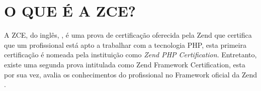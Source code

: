 \chapter{O QUE É A ZCE?}
\label{zce}

A ZCE, do inglês, \textit{\ZCE}, é uma prova de certificação oferecida
pela Zend que certifica que um profissional está apto a trabalhar com a tecnologia PHP, 
esta primeira certificação é nomeada pela instituição como \textit{Zend PHP
Certification}. Entretanto, existe uma segunda prova intitulada como Zend
Framework Certification, esta por sua vez, avalia os conhecimentos do profissional 
no Framework oficial da Zend \cite{websiteZendZce}. 